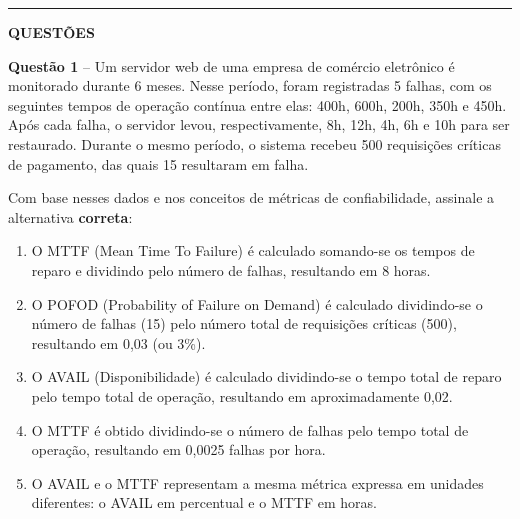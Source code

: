 \documentclass[12pt,a4paper]{article}
\begin{document}
\vspace{0.5cm}

\begin{center}
    \rule{\textwidth}{0.4pt}
    \textbf{QUESTÕES}
\end{center}

\vspace{0.5cm}

\textbf{Questão 1} -- Um servidor web de uma empresa de comércio eletrônico é monitorado durante 6 meses. Nesse período, foram registradas 5 falhas, com os seguintes tempos de operação contínua entre elas: 400h, 600h, 200h, 350h e 450h. Após cada falha, o servidor levou, respectivamente, 8h, 12h, 4h, 6h e 10h para ser restaurado. Durante o mesmo período, o sistema recebeu 500 requisições críticas de pagamento, das quais 15 resultaram em falha.

Com base nesses dados e nos conceitos de métricas de confiabilidade, assinale a alternativa \textbf{correta}:

\vspace{0.3cm}

\begin{enumerate}[label=\textbf{(\Alph*)}]
  
  \item O MTTF (Mean Time To Failure) é calculado somando-se os tempos de reparo e dividindo pelo número de falhas, resultando em 8 horas.

  \item O POFOD (Probability of Failure on Demand) é calculado dividindo-se o número de falhas (15) pelo número total de requisições críticas (500), resultando em 0,03 (ou 3\%).

  \item O AVAIL (Disponibilidade) é calculado dividindo-se o tempo total de reparo pelo tempo total de operação, resultando em aproximadamente 0,02.

  \item O MTTF é obtido dividindo-se o número de falhas pelo tempo total de operação, resultando em 0,0025 falhas por hora.

  \item O AVAIL e o MTTF representam a mesma métrica expressa em unidades diferentes: o AVAIL em percentual e o MTTF em horas.
\end{enumerate}

\vspace{0.5cm}
\end{document}
